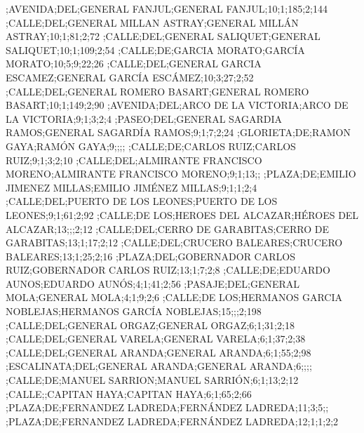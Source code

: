 \begin{itemize}
\begin{tiny}
;AVENIDA;DEL;GENERAL FANJUL;GENERAL FANJUL;10;1;185;2;144
;CALLE;DEL;GENERAL MILLAN ASTRAY;GENERAL MILLÁN ASTRAY;10;1;81;2;72
;CALLE;DEL;GENERAL SALIQUET;GENERAL SALIQUET;10;1;109;2;54
;CALLE;DE;GARCIA MORATO;GARCÍA MORATO;10;5;9;22;26
;CALLE;DEL;GENERAL GARCIA ESCAMEZ;GENERAL GARCÍA ESCÁMEZ;10;3;27;2;52
;CALLE;DEL;GENERAL ROMERO BASART;GENERAL ROMERO BASART;10;1;149;2;90
;AVENIDA;DEL;ARCO DE LA VICTORIA;ARCO DE LA VICTORIA;9;1;3;2;4
;PASEO;DEL;GENERAL SAGARDIA RAMOS;GENERAL SAGARDÍA RAMOS;9;1;7;2;24
;GLORIETA;DE;RAMON GAYA;RAMÓN GAYA;9;;;;
;CALLE;DE;CARLOS RUIZ;CARLOS RUIZ;9;1;3;2;10
;CALLE;DEL;ALMIRANTE FRANCISCO MORENO;ALMIRANTE FRANCISCO MORENO;9;1;13;;
;PLAZA;DE;EMILIO JIMENEZ MILLAS;EMILIO JIMÉNEZ MILLAS;9;1;1;2;4
;CALLE;DEL;PUERTO DE LOS LEONES;PUERTO DE LOS LEONES;9;1;61;2;92
;CALLE;DE LOS;HEROES DEL ALCAZAR;HÉROES DEL ALCAZAR;13;;;2;12
;CALLE;DEL;CERRO DE GARABITAS;CERRO DE GARABITAS;13;1;17;2;12
;CALLE;DEL;CRUCERO BALEARES;CRUCERO BALEARES;13;1;25;2;16
;PLAZA;DEL;GOBERNADOR CARLOS RUIZ;GOBERNADOR CARLOS RUIZ;13;1;7;2;8
;CALLE;DE;EDUARDO AUNOS;EDUARDO AUNÓS;4;1;41;2;56
;PASAJE;DEL;GENERAL MOLA;GENERAL MOLA;4;1;9;2;6
;CALLE;DE LOS;HERMANOS GARCIA NOBLEJAS;HERMANOS GARCÍA NOBLEJAS;15;;;2;198
;CALLE;DEL;GENERAL ORGAZ;GENERAL ORGAZ;6;1;31;2;18
;CALLE;DEL;GENERAL VARELA;GENERAL VARELA;6;1;37;2;38
;CALLE;DEL;GENERAL ARANDA;GENERAL ARANDA;6;1;55;2;98
;ESCALINATA;DEL;GENERAL ARANDA;GENERAL ARANDA;6;;;;
;CALLE;DE;MANUEL SARRION;MANUEL SARRIÓN;6;1;13;2;12
;CALLE;;CAPITAN HAYA;CAPITAN HAYA;6;1;65;2;66
;PLAZA;DE;FERNANDEZ LADREDA;FERNÁNDEZ LADREDA;11;3;5;;
;PLAZA;DE;FERNANDEZ LADREDA;FERNÁNDEZ LADREDA;12;1;1;2;2
\end{tiny}



\end{itemize}
